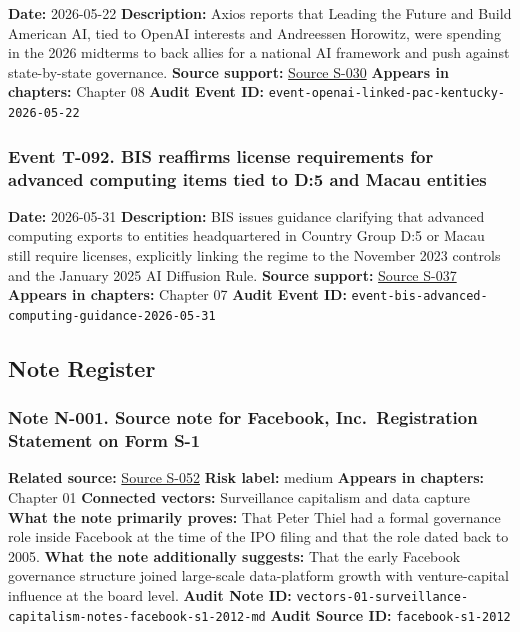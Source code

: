 \documentclass[
  american,
  11pt,
  letterpaper,
]{article}
\begin{document}
\textbf{Date:} 2026-05-22 \textbf{Description:} Axios reports that
Leading the Future and Build American AI, tied to OpenAI interests and
Andreessen Horowitz, were spending in the 2026 midterms to back allies
for a national AI framework and push against state-by-state governance.
\textbf{Source support:}
\hyperref[source-s-030-openai-linked-pac-doubles-down-in-kentucky]{Source
S-030} \textbf{Appears in chapters:} Chapter 08 \textbf{Audit Event ID:}
\texttt{event-openai-linked-pac-kentucky-2026-05-22}

\subsubsection{Event T-092. BIS reaffirms license requirements for
advanced computing items tied to D:5 and Macau
entities}\label{event-t-092-bis-reaffirms-license-requirements-for-advanced-computing-items-tied-to-d-5-and-macau-entities}

\textbf{Date:} 2026-05-31 \textbf{Description:} BIS issues guidance
clarifying that advanced computing exports to entities headquartered in
Country Group D:5 or Macau still require licenses, explicitly linking
the regime to the November 2023 controls and the January 2025 AI
Diffusion Rule. \textbf{Source support:}
\hyperref[source-s-037-guidance-regarding-enforcement-of-license-requirements-for-advanced-computing-items-for-entities-headquartered-in-country-group-d-5-and-macau]{Source
S-037} \textbf{Appears in chapters:} Chapter 07 \textbf{Audit Event ID:}
\texttt{event-bis-advanced-computing-guidance-2026-05-31}

\subsection{Note Register}\label{note-register}

\subsubsection{Note N-001. Source note for Facebook, Inc.~Registration
Statement on Form
S-1}\label{note-n-001-vectors-01-surveillance-capitalism-notes-facebook-s1-2012-md}

\textbf{Related source:}
\hyperref[source-s-052-facebook-inc-registration-statement-on-form-s-1]{Source
S-052} \textbf{Risk label:} medium \textbf{Appears in chapters:} Chapter
01 \textbf{Connected vectors:} Surveillance capitalism and data capture
\textbf{What the note primarily proves:} That Peter Thiel had a formal
governance role inside Facebook at the time of the IPO filing and that
the role dated back to 2005. \textbf{What the note additionally
suggests:} That the early Facebook governance structure joined
large-scale data-platform growth with venture-capital influence at the
board level. \textbf{Audit Note ID:}
\texttt{vectors-01-surveillance-capitalism-notes-facebook-s1-2012-md}
\textbf{Audit Source ID:} \texttt{facebook-s1-2012}
\end{document}
